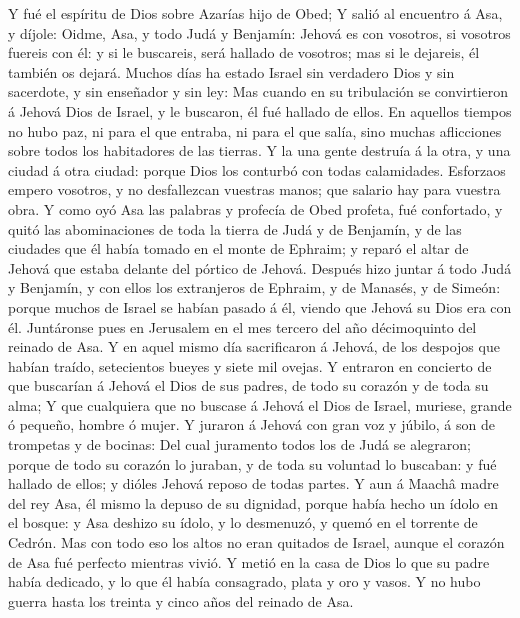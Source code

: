  Y fué el espíritu de Dios sobre Azarías hijo de Obed;
 Y salió al encuentro á Asa, y díjole: Oidme, Asa, y todo
Judá y Benjamín: Jehová es con vosotros, si vosotros fuereis con él: y
si le buscareis, será hallado de vosotros; mas si le dejareis, él
también os dejará.  Muchos días ha estado Israel sin
verdadero Dios y sin sacerdote, y sin enseñador y sin ley: 
Mas cuando en su tribulación se convirtieron á Jehová Dios de Israel, y
le buscaron, él fué hallado de ellos.  En aquellos tiempos
no hubo paz, ni para el que entraba, ni para el que salía, sino muchas
aflicciones sobre todos los habitadores de las tierras.  Y
la una gente destruía á la otra, y una ciudad á otra ciudad: porque Dios
los conturbó con todas calamidades.  Esforzaos empero
vosotros, y no desfallezcan vuestras manos; que salario hay para vuestra
obra.  Y como oyó Asa las palabras y profecía de Obed
profeta, fué confortado, y quitó las abominaciones de toda la tierra de
Judá y de Benjamín, y de las ciudades que él había tomado en el monte de
Ephraim; y reparó el altar de Jehová que estaba delante del pórtico de
Jehová.  Después hizo juntar á todo Judá y Benjamín, y con
ellos los extranjeros de Ephraim, y de Manasés, y de Simeón: porque
muchos de Israel se habían pasado á él, viendo que Jehová su Dios era
con él.  Juntáronse pues en Jerusalem en el mes tercero del
año décimoquinto del reinado de Asa.  Y en aquel mismo día
sacrificaron á Jehová, de los despojos que habían traído, setecientos
bueyes y siete mil ovejas.  Y entraron en concierto de que
buscarían á Jehová el Dios de sus padres, de todo su corazón y de toda
su alma;  Y que cualquiera que no buscase á Jehová el Dios
de Israel, muriese, grande ó pequeño, hombre ó mujer.  Y
juraron á Jehová con gran voz y júbilo, á son de trompetas y de bocinas:
 Del cual juramento todos los de Judá se alegraron; porque
de todo su corazón lo juraban, y de toda su voluntad lo buscaban: y fué
hallado de ellos; y dióles Jehová reposo de todas partes. 
Y aun á Maachâ madre del rey Asa, él mismo la depuso de su dignidad,
porque había hecho un ídolo en el bosque: y Asa deshizo su ídolo, y lo
desmenuzó, y quemó en el torrente de Cedrón.  Mas con todo
eso los altos no eran quitados de Israel, aunque el corazón de Asa fué
perfecto mientras vivió.  Y metió en la casa de Dios lo que
su padre había dedicado, y lo que él había consagrado, plata y oro y
vasos.  Y no hubo guerra hasta los treinta y cinco años del
reinado de Asa.

